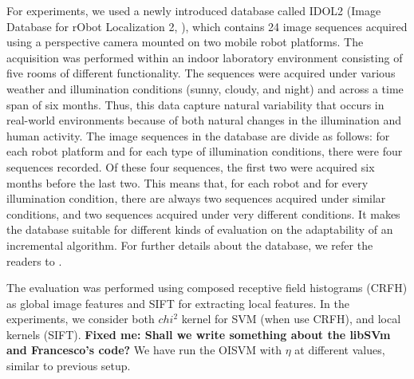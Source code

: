 For experiments, we used a newly introduced database called IDOL2 (Image Database
for rObot Localization 2, \cite{luo:idol2}), which contains 24 image sequences acquired
using a perspective camera mounted on two mobile robot platforms. The acquisition was
performed within an indoor laboratory environment consisting of five rooms of different
functionality. The sequences were acquired under various weather and illumination conditions
(sunny, cloudy, and night) and across a time span of six months. Thus, this data capture
natural variability that occurs in real-world environments because of both natural changes
in the illumination and human activity. The image sequences in the database are divide as
follows: for each robot platform and for each type of illumination conditions, there were
four sequences recorded. Of these four sequences, the first two were acquired six months
before the last two. This means that, for each robot and for every illumination condition,
there are always two sequences acquired under similar conditions, and two sequences acquired
under very different conditions. It makes the database suitable for different kinds of
evaluation on the adaptability of an incremental algorithm. For further details about the
database, we refer the readers to \cite{luo:idol2}.

The evaluation was performed using composed receptive field histograms (CRFH)
\cite{Linde:Lindeberg:ICPR04} as global image features and SIFT \cite{lowe99object}
for extracting local features. In the experiments, we consider both $chi^2$ kernel
for SVM (when use CRFH), and local kernels \cite{wallraven:iccv03} (SIFT).
\textbf{Fixed me: Shall we write something about the libSVm and Francesco's code?} 
We have run the OISVM with $\eta$ at different values, similar to previous setup.

